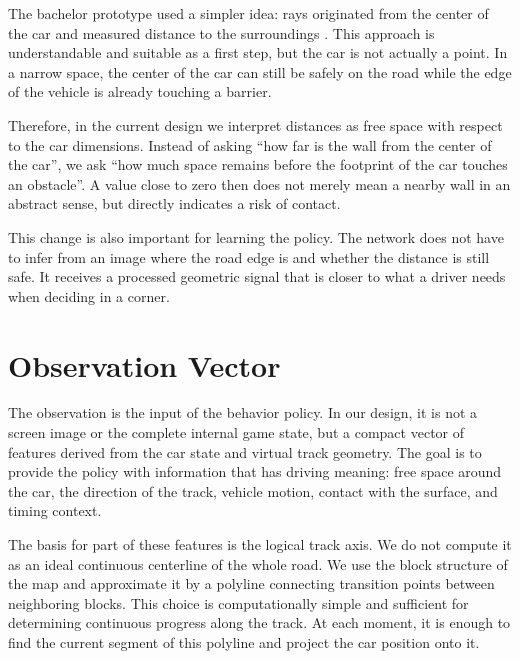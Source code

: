 The bachelor prototype used a simpler idea: rays originated from the center of the car and measured distance to the surroundings \cite{melkovic2024bachelor}. This approach is understandable and suitable as a first step, but the car is not actually a point. In a narrow space, the center of the car can still be safely on the road while the edge of the vehicle is already touching a barrier.

Therefore, in the current design we interpret distances as free space with respect to the car dimensions. Instead of asking ``how far is the wall from the center of the car'', we ask ``how much space remains before the footprint of the car touches an obstacle''. A value close to zero then does not merely mean a nearby wall in an abstract sense, but directly indicates a risk of contact.

This change is also important for learning the policy. The network does not have to infer from an image where the road edge is and whether the distance is still safe. It receives a processed geometric signal that is closer to what a driver needs when deciding in a corner.

\section{Observation Vector}

The observation is the input of the behavior policy. In our design, it is not a screen image or the complete internal game state, but a compact vector of features derived from the car state and virtual track geometry. The goal is to provide the policy with information that has driving meaning: free space around the car, the direction of the track, vehicle motion, contact with the surface, and timing context.

The basis for part of these features is the logical track axis. We do not compute it as an ideal continuous centerline of the whole road. We use the block structure of the map and approximate it by a polyline connecting transition points between neighboring blocks. This choice is computationally simple and sufficient for determining continuous progress along the track. At each moment, it is enough to find the current segment of this polyline and project the car position onto it.

